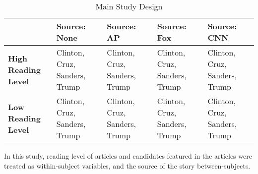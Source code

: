 \begin{center}
\begin{table}
\begin{tabular}{ | m{5em} | m{7em}| m{7em} | m{7em} | m{7em} | } 
 \hline
  & \textbf{Source: None} & \textbf{Source: AP} & \textbf{Source: Fox} & \textbf{Source: CNN} \\
 \hline
 \textbf{High Reading Level} & Clinton, Cruz, Sanders, Trump & Clinton, Cruz, Sanders, Trump & Clinton, Cruz, Sanders, Trump & Clinton, Cruz, Sanders, Trump  \\ 
 \textbf{Low Reading Level} & Clinton, Cruz, Sanders, Trump & Clinton, Cruz, Sanders, Trump & Clinton, Cruz, Sanders, Trump & Clinton, Cruz, Sanders, Trump \\ 
 \hline
\end{tabular}
\caption{Main Study Design}
\label{study2}
\end{table}
\end{center}
\newpage


In this study, reading level of articles and candidates featured in the articles were treated as within-subject variables, and the source of the story between-subjects.




